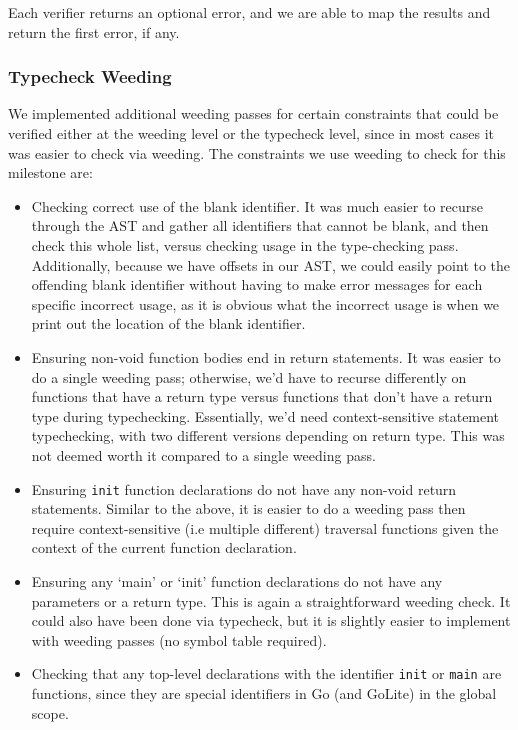 \documentclass[11pt]{article}
\begin{document}
Each verifier returns an optional error, and we are able to map the
results and return the first error, if any.
\subsubsection{Typecheck Weeding}
We implemented additional weeding passes for certain constraints that
could be verified either at the weeding level or the typecheck level,
since in most cases it was easier to check via weeding. The
constraints we use weeding to check for this milestone are:
\begin{itemize}
\item Checking correct use of the blank identifier. It was much easier
  to recurse through the AST and gather all identifiers that cannot be
  blank, and then check this whole list, versus checking usage in the
  type-checking pass. Additionally, because we have offsets in our
  AST, we could easily point to the offending blank identifier without
  having to make error messages for each specific incorrect usage, as
  it is obvious what the incorrect usage is when we print out the
  location of the blank identifier.
\item Ensuring non-void function bodies end in return statements. It
  was easier to do a single weeding pass; otherwise, we'd have to
  recurse differently on functions that have a return type versus
  functions that don't have a return type during
  typechecking. Essentially, we'd need context-sensitive statement
  typechecking, with two different versions depending on return
  type. This was not deemed worth it compared to a single weeding
  pass.
\item Ensuring \texttt{init} function declarations do not have any
  non-void return statements. Similar to the above, it is easier to do
  a weeding pass then require context-sensitive (i.e multiple
  different) traversal functions given the context of the current
  function declaration.
\item Ensuring any `main' or `init' function declarations do not have
  any parameters or a return type. This is again a straightforward
  weeding check.  It could also have been done via typecheck, but it
  is slightly easier to implement with weeding passes (no symbol table
  required).
\item Checking that any top-level declarations with the identifier
  \texttt{init} or \texttt{main} are functions, since they are special
  identifiers in Go (and GoLite) in the global scope.
\end{itemize}
\end{document}
